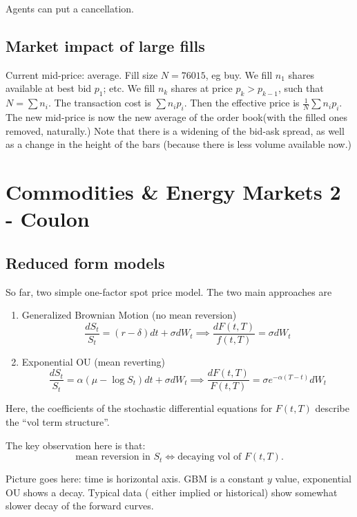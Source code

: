 \documentclass[twocolumn,openany]{book}
\begin{document}
Agents can put a cancellation.

\section{Market impact of large fills}
Current mid-price: average.
Fill size $N=76015$, eg buy. 
We fill $n_1$ shares available at best bid $p_1$; etc.
We fill $n_k$ shares at price $p_k>p_{k-1}$, such that $N=\sum n_i$. 
The transaction cost is $\sum n_ip_i$. 
Then the effective price is $\frac{1}{N}\sum n_ip_i$. 
The new mid-price is now the new average of the order book(with the filled ones removed, naturally.)
Note that there is a widening of the bid-ask spread, as well as a change in the height of the bars (because there is less volume available now.)

\chapter{Commodities \& Energy Markets 2 - Coulon}
\section{Reduced form models}
So far, two simple one-factor spot price model. The two main approaches are
\begin{enumerate}
	\item Generalized Brownian Motion (no mean reversion)
	\begin{equation}
		\frac{dS_t}{S_t} = (r-\delta)dt + \sigma dW_t \implies \frac{dF(t,T)}{f(t,T)} = \sigma dW_t
	\end{equation}
	
	\item Exponential OU (mean reverting)
	\begin{equation}
		\frac{dS_t}{S_t} = \alpha (\mu - \log S_t) dt + \sigma dW_t \implies \frac{dF(t,T)}{F(t,T)} = \sigma e^{-\alpha(T-t)}dW_t
	\end{equation}
\end{enumerate}

Here, the coefficients of the stochastic differential equations for $F(t,T)$ describe the ``vol term structure''.

The key observation here is that:
\begin{equation}
	\text{mean reversion in } S_t \iff \text{decaying vol of } F(t,T).
\end{equation}

Picture goes here: time is horizontal axis. GBM is a constant $y$ value, exponential OU shows a decay. Typical data ( either implied or historical) show somewhat slower decay of the forward curves.
\end{document}

